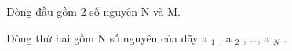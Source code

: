 Dòng đầu gồm 2 số nguyên N và M.  

   Dòng thứ hai gồm N số nguyên của dãy a   $_    1   $   , a   $_    2   $   , …, a   $_    N   $   .